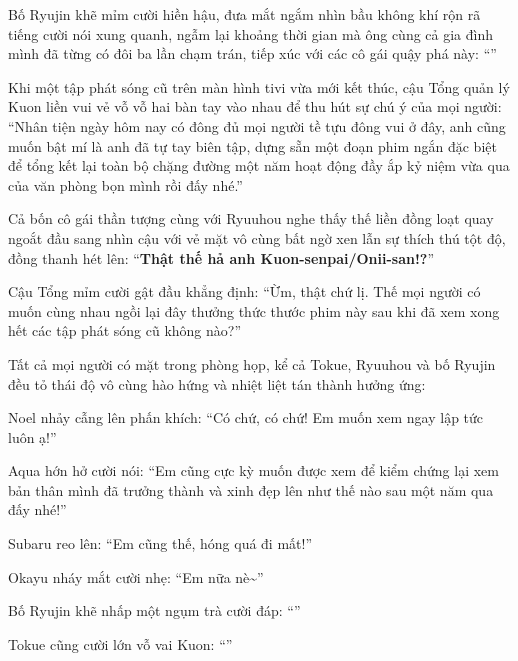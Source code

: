 \documentclass[../main.tex]{subfiles}
\begin{document}
Bố Ryujin khẽ mỉm cười hiền hậu, đưa mắt ngắm nhìn bầu không khí rộn rã tiếng cười nói xung quanh, ngẫm lại khoảng thời gian mà ông cùng cả gia đình mình đã từng có đôi ba lần chạm trán, tiếp xúc với các cô gái quậy phá này: ``''

Khi một tập phát sóng cũ trên màn hình tivi vừa mới kết thúc, cậu Tổng quản lý Kuon liền vui vẻ vỗ vỗ hai bàn tay vào nhau để thu hút sự chú ý của mọi người: ``Nhân tiện ngày hôm nay có đông đủ mọi người tề tựu đông vui ở đây, anh cũng muốn bật mí là anh đã tự tay biên tập, dựng sẵn một đoạn phim ngắn đặc biệt để tổng kết lại toàn bộ chặng đường một năm hoạt động đầy ắp kỷ niệm vừa qua của văn phòng bọn mình rồi đấy nhé.''

Cả bốn cô gái thần tượng cùng với Ryuuhou nghe thấy thế liền đồng loạt quay ngoắt đầu sang nhìn cậu với vẻ mặt vô cùng bất ngờ xen lẫn sự thích thú tột độ, đồng thanh hét lên: ``\textbf{Thật thế hả anh Kuon-senpai/Onii-san!?}''

Cậu Tổng mỉm cười gật đầu khẳng định: ``Ừm, thật chứ lị. Thế mọi người có muốn cùng nhau ngồi lại đây thưởng thức thước phim này sau khi đã xem xong hết các tập phát sóng cũ không nào?''

Tất cả mọi người có mặt trong phòng họp, kể cả Tokue, Ryuuhou và bố Ryujin đều tỏ thái độ vô cùng hào hứng và nhiệt liệt tán thành hưởng ứng:

Noel nhảy cẫng lên phấn khích: ``Có chứ, có chứ! Em muốn xem ngay lập tức luôn ạ!''

Aqua hớn hở cười nói: ``Em cũng cực kỳ muốn được xem để kiểm chứng lại xem bản thân mình đã trưởng thành và xinh đẹp lên như thế nào sau một năm qua đấy nhé!''

Subaru reo lên: ``Em cũng thế, hóng quá đi mất!''

Okayu nháy mắt cười nhẹ: ``Em nữa nè\~{}''

Bố Ryujin khẽ nhấp một ngụm trà cười đáp: ``''

Tokue cũng cười lớn vỗ vai Kuon: ``''
\end{document}
